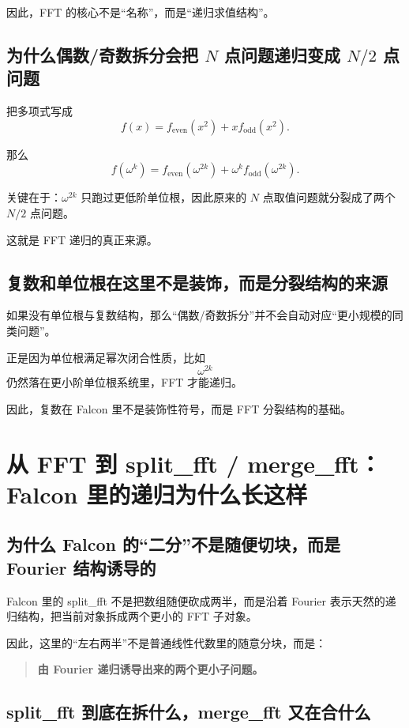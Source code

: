 \documentclass[11pt,a4paper]{ctexart}
\begin{document}
因此，FFT 的核心不是“名称”，而是“递归求值结构”。

\subsection{为什么偶数/奇数拆分会把 \(N\) 点问题递归变成 \(N/2\) 点问题}

把多项式写成
\[
f(x)=f_{\mathrm{even}}(x^2)+x f_{\mathrm{odd}}(x^2).
\]

那么
\[
f(\omega^k)=f_{\mathrm{even}}(\omega^{2k})+\omega^k f_{\mathrm{odd}}(\omega^{2k}).
\]

关键在于：\(\omega^{2k}\) 只跑过更低阶单位根，因此原来的 \(N\) 点取值问题就分裂成了两个 \(N/2\) 点问题。

这就是 FFT 递归的真正来源。

\subsection{复数和单位根在这里不是装饰，而是分裂结构的来源}

如果没有单位根与复数结构，那么“偶数/奇数拆分”并不会自动对应“更小规模的同类问题”。

正是因为单位根满足幂次闭合性质，比如
\[
\omega^{2k}
\]
仍然落在更小阶单位根系统里，FFT 才能递归。

因此，复数在 Falcon 里不是装饰性符号，而是 FFT 分裂结构的基础。

\section{从 FFT 到 split\_fft / merge\_fft：Falcon 里的递归为什么长这样}

\subsection{为什么 Falcon 的“二分”不是随便切块，而是 Fourier 结构诱导的}

Falcon 里的 split\_fft 不是把数组随便砍成两半，而是沿着 Fourier 表示天然的递归结构，把当前对象拆成两个更小的 FFT 子对象。

因此，这里的“左右两半”不是普通线性代数里的随意分块，而是：

\begin{quote}
\textbf{由 Fourier 递归诱导出来的两个更小子问题。}
\end{quote}

\subsection{split\_fft 到底在拆什么，merge\_fft 又在合什么}
\end{document}

